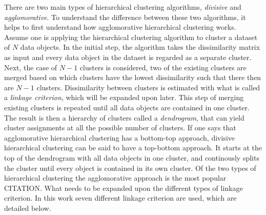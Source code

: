There are two main types of hierarchical clustering algorithms, \textit{divisive} and \textit{agglomorative}. To understand the difference between these two algorithms, it helps to first understand how agglomorative hierarchical clustering works. Assume one is applying the hierarchical clustering algorithm to cluster a dataset of $N$ data objects. In the initial step, the algorithm takes the dissimilarity matrix as input and every data object in the dataset is regarded as a separate cluster. Next, the case of $N-1$ clusters is considered, two of the existing clusters are merged based on which clusters have the lowest dissimilarity such that there then are $N-1$ clusters. Dissimilarity between clusters is estimated with what is called a \textit{linkage criterion}, which will be expanded upon later. This step of merging existing clusters is repeated until all data objects are contained in one cluster. The result is then a hierarchy of clusters called a \textit{dendrogram}, that can yield cluster assignments at all the possible number of clusters. If one says that agglomorative hierarchical clustering has a bottom-top approach, divisive hierarchical clustering can be said to have a top-bottom approach. It starts at the top of the dendrogram with all data objects in one cluster, and continously splits the cluster until every object is contained in its own cluster. Of the two types of hierarchical clustering the agglomorative approach is the most popular CITATION. What needs to be expanded upon the different types of linkage criterion. In this work seven different linkage criterion are used, which are detailed below.

